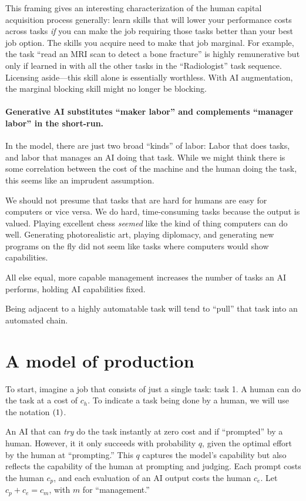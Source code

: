 \documentclass{article}
\begin{document}
This framing gives an interesting characterization of the human capital acquisition process  generally: learn skills that will lower your performance costs across tasks \emph{if} you can make the job requiring those tasks better than your best job option.
The skills you acquire need to make that job marginal. 
For example, the task ``read an MRI scan to detect a bone fracture'' is highly remunerative but only if learned in with all the other tasks in the ``Radiologist'' task sequence.
Licensing aside---this skill alone is essentially worthless.  
With AI augmentation, the marginal blocking skill might no longer be blocking. 

\paragraph{Generative AI substitutes ``maker labor'' and complements ``manager labor'' in the short-run.}
In the model, there are just two broad ``kinds'' of labor: 
Labor that does tasks, and labor that manages an AI doing that task. 
While we might think there is some correlation between the cost of the machine and the human doing the task, this seems like an imprudent assumption.

We should not presume that tasks that are hard for humans are easy for computers or vice versa. 
We do hard, time-consuming tasks because the output is valued. 
Playing excellent chess \emph{seemed} like the kind of thing computers can do well. 
Generating photorealistic art, playing diplomacy, and generating new programs on the fly did not seem like tasks where computers would show capabilities.

All else equal, more capable management increases the number of tasks an AI performs, holding AI capabilities fixed. 

Being adjacent to a highly automatable task will tend to ``pull'' that task into an automated chain.


\section{A model of production}
To start, imagine a job that consists of just a single task: task 1.
A human can do the task at a cost of $c_h$.
To indicate a task being done by a human, we will use the notation $( 1 )$.

An AI that can \emph{try} do the task instantly at zero cost and if ``prompted'' by a human.
However, it it only succeeds with probability $q$, given the optimal effort by the human at ``prompting.''
This $q$ captures the model's capability but also reflects the capability of the human at prompting and judging.
Each prompt costs the human $c_p$, and each evaluation of an AI output costs the human $c_e$.
Let $c_p + c_e = c_m$, with $m$ for ``management.''
\end{document}
